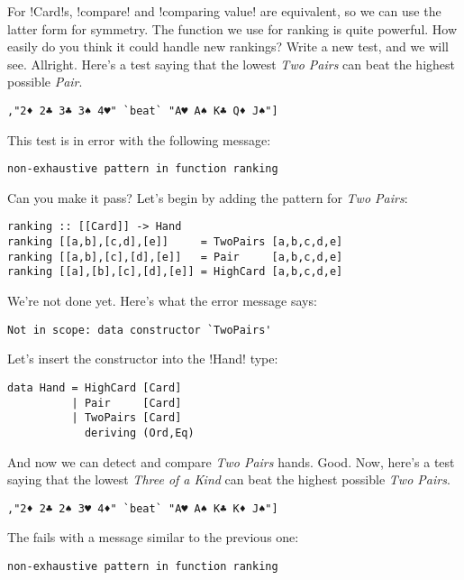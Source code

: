 \success For \il!Card!s, \il!compare! and \il!comparing value! are equivalent, so we can use the latter form for symmetry.
\lhN The function we use for ranking is quite powerful. How easily do you think it could handle new rankings?
\lhA Write a new test, and we will see.
\lhN Allright. Here's a test saying that the lowest \emph{Two Pairs} can beat the highest possible \emph{Pair}.
\begin{lstlisting}[frame=single]
       ,"2♦ 2♣ 3♣ 3♠ 4♥" `beat` "A♥ A♠ K♣ Q♦ J♠"]
\end{lstlisting}
This test is in error with the following message: \\
\begin{small}
\begin{verbatim}
non-exhaustive pattern in function ranking
\end{verbatim}
\end{small}
Can you make it pass?
\lhA \error Let's begin by adding the pattern for \emph{Two Pairs}:
\begin{lstlisting}[frame=single]
ranking :: [[Card]] -> Hand
ranking [[a,b],[c,d],[e]]     = TwoPairs [a,b,c,d,e]
ranking [[a,b],[c],[d],[e]]   = Pair     [a,b,c,d,e]
ranking [[a],[b],[c],[d],[e]] = HighCard [a,b,c,d,e] 
\end{lstlisting}
\error We're not done yet.
\lhN Here's what the error message says: \\
\begin{small}
\begin{verbatim}
Not in scope: data constructor `TwoPairs'
\end{verbatim}
\end{small}
\lhA Let's insert the constructor into the \il!Hand! type:
\begin{lstlisting}[frame=single]
data Hand = HighCard [Card]
          | Pair     [Card]
          | TwoPairs [Card]
            deriving (Ord,Eq)
\end{lstlisting}
\success And now we can detect and compare \emph{Two Pairs} hands. 
\newpage
\lhN Good. Now, here's a test saying that the lowest \emph{Three of a Kind} can beat the highest possible \emph{Two Pairs}.
\begin{lstlisting}[frame=single]
       ,"2♦ 2♣ 2♠ 3♥ 4♦" `beat` "A♥ A♠ K♣ K♦ J♠"]
\end{lstlisting}
The fails with a message similar to the previous one: \\
\begin{small}
\begin{verbatim}
non-exhaustive pattern in function ranking
\end{verbatim}
\end{small}
